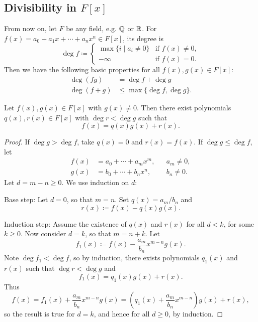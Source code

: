 \documentclass[10pt, a4paper]{article}
\begin{document}
\subsection{Divisibility in \texorpdfstring{$F[x]$}{}}
From now on,
let $F$ be any field,
e.g. $\mathbb{Q}$ or $\mathbb{R}$.
For $f(x) = a_0 + a_1x + \dotsi + a_nx ^ n \in F[x]$,
its degree is
\[
\deg{f} \coloneqq \begin{cases}
    \max\{i \mid a_i \neq 0\} &\text{if } f(x) \neq 0, \\
    -\infty &\text{if } f(x) = 0.
\end{cases}
\]
Then we have the following basic properties for all $f(x), g(x) \in F[x]$:
\begin{align*}
    \deg(fg) &= \deg{f} + \deg{g} \\
    \deg(f + g) &\leq \max\{\deg{f}, \deg{g}\}.
\end{align*}

\begin{proposition}\label{pre:algII:prop:expolywithdeg}
    Let $f(x), g(x) \in F[x]$ with $g(x) \neq 0$.
    Then there exist polynomials $q(x), r(x) \in F[x]$ with $\deg{r} < \deg{g}$ such that
    \[
    f(x) = q(x)g(x) + r(x).
    \]

    \begin{proof}
        If $\deg{g} > \deg{f}$,
        take $q(x) = 0$ and $r(x) = f(x)$.
        If $\deg{g} \leq \deg{f}$,
        let
        \begin{align*}
            f(x) &= a_0 + \dotsi + a_mx ^ m, && a_m \neq 0, \\
            g(x) &= b_0 + \dotsi + b_nx ^ n, && b_n \neq 0.
        \end{align*}
        Let $d = m - n \geq 0$.
        We use induction on $d$:

        Base step:
        Let $d = 0$,
        so that $m = n$.
        Set $q(x) = a_m / b_n$ and
        \[
        r(x) \coloneqq f(x) - q(x)g(x).
        \]

        Induction step:
        Assume the existence of $q(x)$ and $r(x)$ for all $d < k$,
        for some $k \geq 0$.
        Now consider $d = k$,
        so that $m = n + k$.
        Let
        \[
        f_1(x) \coloneqq f(x) - \frac{a_m}{b_n}x ^ {m - n}g(x).
        \]
        Note $\deg{f_1} < \deg{f}$,
        so by induction,
        there exists polynomials $q_1(x)$ and $r(x)$ such that $\deg{r} < \deg{g}$ and
        \[
        f_1(x) = q_1(x)g(x) + r(x).
        \]
        Thus
        \[
        f(x) = f_1(x) + \frac{a_m}{b_n}x ^ {m - n}g(x) = (q_1(x) + \frac{a_m}{b_n}x ^ {m - n})g(x) + r(x),
        \]
        so the result is true for $d = k$,
        and hence for all $d \geq 0$,
        by induction.
    \end{proof}
\end{proposition}
\end{document}
